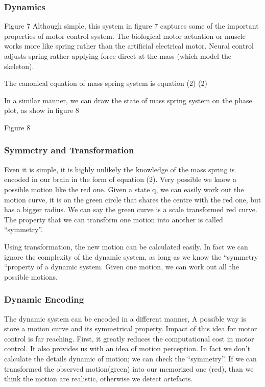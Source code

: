 \subsubsection*{Dynamics}

Figure 7
Although simple, this system in figure 7 captures some of the important properties of motor control system.
The biological motor actuation or muscle works more like spring rather than the artificial electrical motor. Neural control adjusts spring rather applying force direct at the mass (which model the skeleton).


The canonical equation of mass spring system is equation (2)
(2)

In a similar manner, we can draw the state of mass spring system on the phase plot, as show in figure 8


Figure 8
\subsubsection*{Symmetry and Transformation}
Even it is simple, it is highly unlikely the knowledge of the mass spring is encoded in our brain in the form of equation (2).
Very possible we know a possible motion like the red one.
 Given a state q, we can easily work out the motion curve, it is on the green circle that shares the centre with the red one, but has a bigger radius.
 We can say the green curve is a scale transformed red curve.
 The property that we can transform one motion into another is called “symmetry”.

Using transformation, the new motion can be calculated easily.
 In fact we can ignore the complexity of the dynamic system, as long as we know the “symmetry “property of a dynamic system. Given one motion, we can work out all the possible motions.

\subsubsection*{Dynamic Encoding}

The dynamic system can be encoded in a different manner,
A possible way is store a motion curve and its symmetrical property.
Impact of this idea for motor control is far reaching. 
First, it greatly reduces the computational cost in motor control.
It also provides us with an idea of motion perception. 
In fact we don’t calculate the details dynamic of motion; we can check the “symmetry”. If we can transformed the observed motion(green) into our memorized one (red), than we think the motion are realistic, otherwise we detect artefacts.


